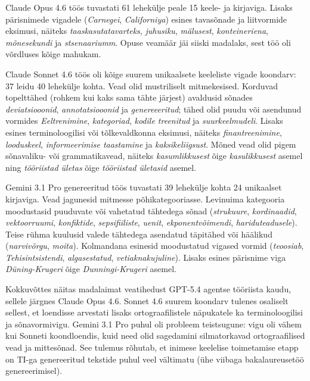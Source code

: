 Claude Opus 4.6 töös tuvastati 61 lehekülje peale 15 keele- ja kirjaviga. Lisaks pärisnimede vigadele (\textit{Carnegei}, \textit{Californiya}) esines tavasõnade ja liitvormide eksimusi, näiteks \textit{taaskasutatavarteks}, \textit{juhusiku}, \textit{mälusest}, \textit{konteineriena}, \textit{mõnesekundi} ja \textit{stsenaariumm}. Opuse veamäär jäi siiski madalaks, sest töö oli võrdluses kõige mahukam.

Claude Sonnet 4.6 töös oli kõige suurem unikaalsete keeleliste vigade koondarv: 37 leidu 40 lehekülje kohta. Vead olid mustriliselt mitmekesised. Korduvad topelttähed (rohkem kui kaks sama tähte järjest) avaldusid sõnades \textit{deviatsiooonid}, \textit{annotatsiooonid} ja \textit{genereeeritud}; tähed olid puudu või asendunud vormides \textit{Eeltrenimine}, \textit{kategoriad}, \textit{kodile treenitud} ja \textit{suurkeelmudeli}. Lisaks esines terminoloogilisi või tõlkevaldkonna eksimusi, näiteks \textit{finantreenimine}, \textit{looduskeel}, \textit{informeerimise taastamine} ja \textit{kaksikeliigsust}. Mõned vead olid pigem sõnavaliku- või grammatikavead, näiteks \textit{kasumlikkusest} õige \textit{kasulikkusest} asemel ning \textit{tööriistad ületas} õige \textit{tööriistad ületasid} asemel.

Gemini 3.1 Pro genereeritud töös tuvastati 39 lehekülje kohta 24 unikaalset kirjaviga. Vead jagunesid mitmesse põhikategooriasse. Levinuima kategooria moodustasid puuduvate või vahetatud tähtedega sõnad (\textit{strukuure}, \textit{kordinaadid}, \textit{vektoorruumi}, \textit{konfiktide}, \textit{sepsifiiliste}, \textit{uenit}, \textit{ekponentvõimendi}, \textit{hariduteadusele}). Teise rühma kuulusid valede tähtedega asendatud täpitähed või häälikud (\textit{narvivõrgu}, \textit{moita}). Kolmandana esinesid moodustatud vigased vormid (\textit{teoosiab}, \textit{Tehisintsistendi}, \textit{algasestatud}, \textit{vetiaknakujuline}). Lisaks esines pärisnime viga \textit{Düning-Krugeri} õige \textit{Dunningi-Krugeri} asemel.

Kokkuvõttes näitas madalaimat veatihedust GPT-5.4 agentse tööriista kaudu, sellele järgnes Claude Opus 4.6. Sonnet 4.6 suurem koondarv tulenes osaliselt sellest, et loendisse arvestati lisaks ortograafilistele näpukatele ka terminoloogilisi ja sõnavormivigu. Gemini 3.1 Pro puhul oli probleem teistsugune: vigu oli vähem kui Sonneti koondloendis, kuid need olid sagedamini silmatorkavad ortograafilised vead ja mittesõnad. See tulemus rõhutab, et inimese keelelise toimetamise etapp on TI-ga genereeritud tekstide puhul veel vältimatu (ühe viibaga bakalaureusetöö genereerimisel).


